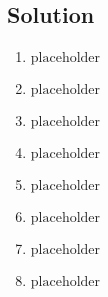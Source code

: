 \documentclass[a4paper, 11pt]{article}
\begin{document}
    \subsection{Solution}
      \begin{enumerate}[label=\alph*.]
        \item \begin{mdframed}[style=AnswerFrame]
          $\text{placeholder}$
          \end{mdframed}
        \item \begin{mdframed}[style=AnswerFrame]
          $\text{placeholder}$
          \end{mdframed}
        \item \begin{mdframed}[style=AnswerFrame]
          $\text{placeholder}$
          \end{mdframed}
        \item \begin{mdframed}[style=AnswerFrame]
          $\text{placeholder}$
          \end{mdframed}
        \item \begin{mdframed}[style=AnswerFrame]
          $\text{placeholder}$
          \end{mdframed}
        \item \begin{mdframed}[style=AnswerFrame]
          $\text{placeholder}$
          \end{mdframed}
        \item \begin{mdframed}[style=AnswerFrame]
          $\text{placeholder}$
          \end{mdframed}
        \item \begin{mdframed}[style=AnswerFrame]
          $\text{placeholder}$
          \end{mdframed}
      \end{enumerate}


  \newpage
  \nocite{textbook}
  \printbibliography[%
    heading=bibintoc,%
    title={Works Consulted}%
  ]{}
  
\end{document}
